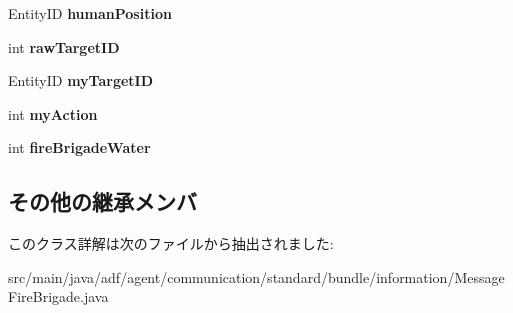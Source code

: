 \begin{DoxyCompactItemize}
Entity\+ID {\bfseries human\+Position}
\item 
\hypertarget{classadf_1_1agent_1_1communication_1_1standard_1_1bundle_1_1information_1_1MessageFireBrigade_ade72f4ed2f9ee91b683016d412194a5c}{}\label{classadf_1_1agent_1_1communication_1_1standard_1_1bundle_1_1information_1_1MessageFireBrigade_ade72f4ed2f9ee91b683016d412194a5c} 
int {\bfseries raw\+Target\+ID}
\item 
\hypertarget{classadf_1_1agent_1_1communication_1_1standard_1_1bundle_1_1information_1_1MessageFireBrigade_aa6867a4e9cb8cf725c3e1a0b95d1e73f}{}\label{classadf_1_1agent_1_1communication_1_1standard_1_1bundle_1_1information_1_1MessageFireBrigade_aa6867a4e9cb8cf725c3e1a0b95d1e73f} 
Entity\+ID {\bfseries my\+Target\+ID}
\item 
\hypertarget{classadf_1_1agent_1_1communication_1_1standard_1_1bundle_1_1information_1_1MessageFireBrigade_af50a982c632517633dc389957d2b6a6d}{}\label{classadf_1_1agent_1_1communication_1_1standard_1_1bundle_1_1information_1_1MessageFireBrigade_af50a982c632517633dc389957d2b6a6d} 
int {\bfseries my\+Action}
\item 
\hypertarget{classadf_1_1agent_1_1communication_1_1standard_1_1bundle_1_1information_1_1MessageFireBrigade_a920c8da5ee4115534e8bdaad273b84fa}{}\label{classadf_1_1agent_1_1communication_1_1standard_1_1bundle_1_1information_1_1MessageFireBrigade_a920c8da5ee4115534e8bdaad273b84fa} 
int {\bfseries fire\+Brigade\+Water}
\end{DoxyCompactItemize}
\subsection*{その他の継承メンバ}


このクラス詳解は次のファイルから抽出されました\+:\begin{DoxyCompactItemize}
\item 
src/main/java/adf/agent/communication/standard/bundle/information/Message\+Fire\+Brigade.\+java\end{DoxyCompactItemize}
